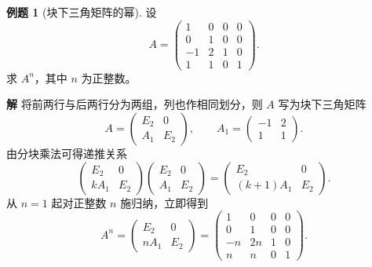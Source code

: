 \documentclass[UTF8, fontset=fandol, a4paper, 12pt]{ctexart}
\theoremstyle{definition}
\newtheorem{example}[definition]{例题}
\begin{document}
\begin{example}[块下三角矩阵的幂]
设
\[
 A=\begin{pmatrix}
 1&0&0&0\\
 0&1&0&0\\
 -1&2&1&0\\
 1&1&0&1
 \end{pmatrix}.
\]
求 $A^n$，其中 $n$ 为正整数。
\end{example}
\noindent\textbf{解}\quad
将前两行与后两行分为两组，列也作相同划分，则 $A$ 写为块下三角矩阵
\[
 A=\begin{pmatrix}E_2&0\\ A_1&E_2\end{pmatrix},
 \qquad A_1=\begin{pmatrix}-1&2\\1&1\end{pmatrix}.
\]
由分块乘法可得递推关系
\[
 \begin{pmatrix}E_2&0\\ kA_1&E_2\end{pmatrix}
 \begin{pmatrix}E_2&0\\ A_1&E_2\end{pmatrix}
 =\begin{pmatrix}E_2&0\\ (k+1)A_1&E_2\end{pmatrix}.
\]
从 $n=1$ 起对正整数 $n$ 施归纳，立即得到
\[
 A^n=\begin{pmatrix}E_2&0\\ nA_1&E_2\end{pmatrix}
     =\begin{pmatrix}
       1&0&0&0\\
       0&1&0&0\\
       -n&2n&1&0\\
       n&n&0&1
      \end{pmatrix}.
\]
\end{document}
